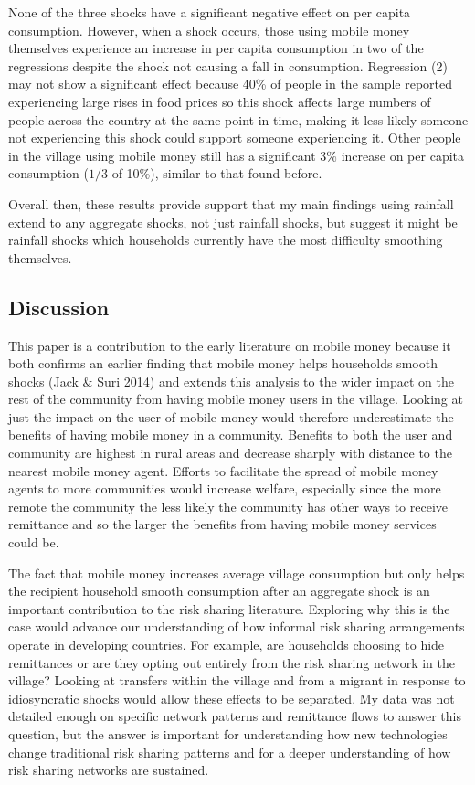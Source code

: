 None of the three shocks have a significant negative effect on per capita consumption. However, when a shock occurs, those using mobile money themselves experience an increase in per capita consumption in two of the regressions despite the shock not causing a fall in consumption. Regression (2) may not show a significant effect because 40\% of people in the sample reported experiencing large rises in food prices so this shock affects large numbers of people across the country at the same point in time, making it less likely someone not experiencing this shock could support someone experiencing it. Other people in the village using mobile money still has a  significant 3\% increase on per capita consumption ($1/3$ of 10\%), similar to that found before. 

Overall then, these results provide support that my main findings using rainfall extend to any aggregate shocks, not just rainfall shocks, but suggest it might be rainfall shocks which households currently have the most difficulty smoothing themselves. 



\subsection{Discussion} 
This paper is a contribution to the early literature on mobile money because it both confirms an earlier finding that mobile money helps households smooth  shocks (Jack \& Suri 2014) and extends this analysis to the wider impact on the rest of the community from having mobile money users in the village. Looking at just the impact on the user of mobile money would therefore underestimate the benefits of having mobile money in a community. Benefits to both the user and community are highest in rural areas and decrease sharply with distance to the nearest mobile money agent. Efforts to facilitate the spread of mobile money agents to more communities would increase welfare, especially since the more remote the community the less likely the community has other ways to receive remittance and so the larger the benefits from having mobile money services could be. 

The fact that mobile money increases average village consumption but only helps the recipient household smooth consumption after an aggregate shock is an important contribution to the risk sharing literature. Exploring why this is the case would advance our understanding of how informal risk sharing arrangements operate in developing countries. For example, are households choosing to hide remittances or are they opting out entirely from the risk sharing network in the village? Looking at transfers within the village and from a migrant in response to idiosyncratic shocks would allow these effects to be separated. My data was not detailed enough on specific network patterns and remittance flows to answer this question, but the answer is important for understanding how new technologies change traditional risk sharing patterns and for a deeper understanding of how risk sharing networks are sustained.  

